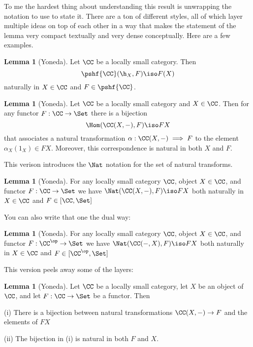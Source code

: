 \documentclass[12pt]{article}
\theoremstyle{definition}
\newtheorem{lemma}[thm]{Lemma}
\theoremstyle{definition}
\theoremstyle{definition}
\numberwithin{equation}{section}
\begin{document}
To me the hardest thing about understanding this result is unwrapping the notation to use to state it.
There are a ton of different styles, all of which layer multiple ideas on top of each other in a way that
makes the statement of the lemma very compact textually and very dense conceptually. Here are a few examples.

\newpage

\begin{lemma}[Yoneda]   
\label{yoneda1}
Let $\CC$ be a locally small category.  Then
% 
\begin{equation}        
\label{eq:yoneda}
\pshf{\CC}(\h_X, F)
\iso
F(X)
\end{equation}
% 
naturally in $X \in \CC$ and $F \in \pshf{\CC}$.  
\end{lemma}

\begin{lemma}[Yoneda]\label{yoneda2} Let $\CC$ be a locally small category and $X \in
\CC$. Then for any functor $F : \CC \to \Set$ there is a bijection
$$
\Hom(\CC(X,-), F) \iso FX
$$
that associates a natural transformation $\alpha:\CC(X,-) \implies F$ to the element
$\alpha_X(1_X) \in FX$. Moreover, this correspondence is natural in both $X$ and $F$.
\end{lemma}

\noindent This verison introduces the $\Nat$ notation for the set of natural transforms.

\begin{lemma}[Yoneda]\label{yoneda3} For any locally small category $\CC$, object $X
\in \CC$, and functor $F:\CC \to \Set$ we have  $\Nat(\CC(X,-),F) \iso FX$
both naturally in $X \in \CC$ and $F \in [\CC, \Set]$
\end{lemma}

\noindent You can also write that one the dual way:
\begin{lemma}[Yoneda]\label{yoneda4} For any locally small category $\CC$, object
$X \in \CC$, and functor $F:\CC^{\op} \to \Set$ we have  $\Nat(\CC(-,X),F)
\iso FX$ both naturally in $X \in \CC$ and $F \in [\CC^{\op}, \Set]$
\end{lemma}
\noindent
This version peels away some of the layers:

\begin{lemma}[Yoneda]\label{yoneda5}
Let $\CC$ be a locally small category, let $X$ be an object of $\CC$, and let $F: \CC \to \Set$ be a functor. Then

(i) There is a bijection between natural transformations $\CC(X, -) \to F$ and the elements of $FX$

(ii) The bijection in (i) is natural in both $F$ and $X$.
\end{lemma}
\end{document}
